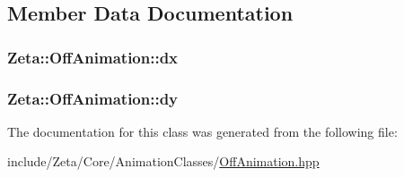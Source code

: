 \subsection{Member Data Documentation}
\hypertarget{classZeta_1_1OffAnimation_ab879452af04426400b413016d06e323d}{
\subsubsection[{dx}]{ Zeta\+::\+Off\+Animation\+::dx\hspace{0.3cm}{\ttfamily [private]}}}\label{classZeta_1_1OffAnimation_ab879452af04426400b413016d06e323d}
\hypertarget{classZeta_1_1OffAnimation_ac8e57a2ab7810a34f1b984e72cb68081}{
\subsubsection[{dy}]{ Zeta\+::\+Off\+Animation\+::dy\hspace{0.3cm}{\ttfamily [private]}}}\label{classZeta_1_1OffAnimation_ac8e57a2ab7810a34f1b984e72cb68081}


The documentation for this class was generated from the following file\+:\begin{DoxyCompactItemize}
\item 
include/\+Zeta/\+Core/\+Animation\+Classes/\hyperlink{OffAnimation_8hpp}{Off\+Animation.\+hpp}\end{DoxyCompactItemize}
